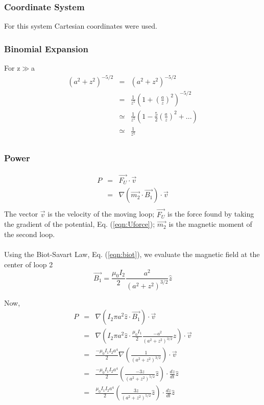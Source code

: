 \documentclass[12pt]{revtex4}
\begin{document}
\subsubsection{Coordinate System}
For this system Cartesian coordinates were used. 

\subsubsection{Binomial Expansion}\label{bin.mU}
For z$\gg$a
\begin{eqnarray*}
\left(a^2+z^2\right)^{-5/2}&=&\left(a^2+z^2\right)^{-5/2}\\
&=&\frac{1}{z^5}\left(1+(\frac{a}{z})^2\right)^{-5/2}\\
&\simeq& \frac{1}{z^5}\left(1-\frac{5}{2}(\frac{a}{z})^2+...\right)\\
&\simeq& \frac{1}{z^5}\\
\end{eqnarray*}

\subsubsection{Power}
\begin{eqnarray*}
P&=&\vec{F_{U}} \cdot \vec{v}\\
&=&\nabla (\vec{m_2} \cdot \vec{B_1}) \cdot \vec{v}\\
\end{eqnarray*}
The vector $\vec{v}$ is the velocity of the moving loop; $\vec{F_{U}} $ is the force found by taking the gradient of the potential, Eq. (\ref{eqn:Uforce});  $\vec{m_2}$ is the magnetic moment of the second loop.\\    \\ 
Using the Biot-Savart Law, Eq. (\ref{eqn:biot}), we evaluate the magnetic field at the center of loop 2 
\begin{equation}
\vec{B_1}=\frac{\mu_{0}I_2}{2} \frac{a^2}{\left(a^2+z^2\right)^{3/2}} \label{eqn:bz} \hat{z}
\end{equation}


Now, 
\begin{eqnarray*}
P&=&\nabla (I_2 \pi a^2 \hat{z}\cdot \vec{B_1}) \cdot \vec{v}\\
&=&\nabla (I_2 \pi a^2 \hat{z}\cdot \frac{\mu_{0}I_1}{2} \frac{-a^2}{\left(a^2+z^2\right)^{3/2}} \label{eqn:bz} \hat{z}) \cdot \vec{v}\\
&=& \frac{-\mu_{0}I_1 I_2a^4}{2}\nabla \left(  \frac{1}{\left(a^2+z^2\right)^{3/2}} \right) \cdot \vec{v}\\
&=& \frac{-\mu_{0}I_1 I_2a^4}{2} \left(  \frac{-3 z }{\left(a^2+z^2\right)^{5/2}} \hat{z}\right) \cdot \frac{dz}{dt}\hat{z}\\
&=& \frac{\mu_{0}I_1 I_2a^4}{2} \left(  \frac{3 z }{\left(a^2+z^2\right)^{5/2}} \hat{z}\right) \cdot \frac{dz}{dt}\hat{z}\\
\end{eqnarray*}
\end{document}
